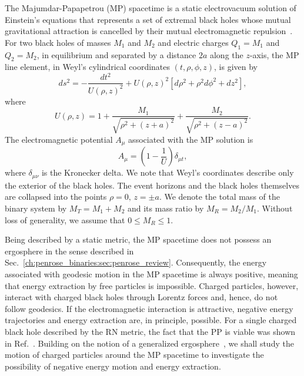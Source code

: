 The Majumdar-Papapetrou (MP) spacetime is a static electrovacuum solution of Einstein's equations that represents a set of extremal black holes whose mutual gravitational attraction is cancelled by their mutual electromagnetic repulsion~\cite{MAJUMDAR1947,PAPAPETROU1947,HARTLE1972}.
For two black holes of masses $M_1$ and $M_2$ and electric charges $Q_1=M_1$ and $Q_2=M_2$, in equilibrium and separated by a distance $2a$ along the $z$-axis, the MP line element, in Weyl's cylindrical coordinates $(t,\rho,\phi,z)$, is given by~\cite{SMERAK2016}
\begin{equation}
  d s^2 = - \frac{d t^2}{U(\rho,z)^{2}} + U(\rho,z)^2\left[d\rho^2 + \rho^2 d\phi^2 + d z^2\right],
  \label{eq:majumdar_papapetrou_line_element}
\end{equation}
%
where
\begin{equation}
  U(\rho,z) = 1 + \frac{M_1}{\sqrt{\rho^2 + (z+a)^2}} + \frac{M_2}{\sqrt{\rho^2 + (z-a)^2}}.
  \label{eq:mp_metric_potential_cylindric}
\end{equation}
The electromagnetic potential $A_\mu$ associated with the MP solution is
\begin{equation}
  A_\mu = \left(1 - \frac{1}{U}\right) \delta_{\mu t},
  \label{eq:electromagnetic_potential_mp}
\end{equation}
where $\delta_{\mu \nu}$ is the Kronecker delta. We note that Weyl's coordinates describe only the exterior of the black holes. The event horizons and the black holes themselves are collapsed into the points $\rho=0, \, z=\pm a$. We denote the total mass of the binary system by $M_T=M_1+M_2$ and its mass ratio by $M_R=M_2/M_1$. Without loss of generality, we assume that $0 \le M_R \le 1$.

Being described by a static metric, the MP spacetime does not possess an ergosphere in the sense described in Sec.~\ref{ch:penrose_binaries:sec:penrose_review}. Consequently, the energy associated with geodesic motion in the MP spacetime is always positive, meaning that energy extraction by free particles is impossible. Charged particles, however, interact with charged black holes through Lorentz forces and, hence, do not follow geodesics.
If the electromagnetic interaction is attractive, negative energy trajectories and energy extraction are, in principle, possible. For a single charged black hole described by the RN metric, the fact that the PP is viable was shown in Ref.~\cite{DENARDO1973}. Building on the notion of a generalized ergosphere~\cite{RUFFINI1971,DENARDO1973}, we shall study the motion of charged particles around the MP spacetime to investigate the possibility of negative energy motion and energy extraction.

